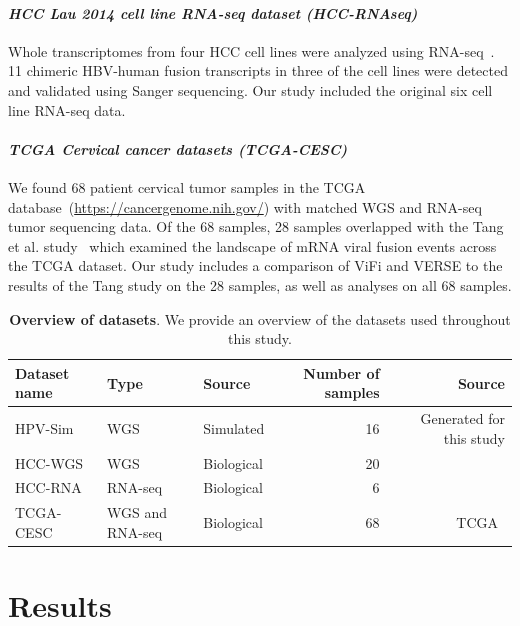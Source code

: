 \documentclass[10pt]{article}
\begin{document}
\paragraph{\emph{HCC Lau 2014 cell line RNA-seq dataset (HCC-RNAseq)}}
Whole transcriptomes from four HCC cell lines were analyzed using RNA-seq~\cite{Lau2014}.  11 chimeric HBV-human fusion transcripts in three of the cell lines were detected and validated using Sanger sequencing.  Our study included the original six cell line RNA-seq data.  

\paragraph{\emph{TCGA Cervical cancer datasets (TCGA-CESC)}}
We found 68 patient cervical tumor samples in the TCGA database~(\url{https://cancergenome.nih.gov/}) with matched WGS and RNA-seq tumor sequencing data.  Of the 68 samples, 28 samples overlapped with the Tang et al. study~\cite{Tang2013} which examined the landscape of mRNA viral fusion events across the TCGA dataset.  Our study includes a comparison of ViFi and VERSE to the results of the Tang study on the 28 samples, as well as analyses on all 68 samples.


\begin{table}[htb]
\centering
\caption{\textbf{Overview of datasets}.  We provide an overview of the datasets used throughout this study.  }
\label{table:data}
\begin{tabular}{|l|l|l|r|r|}
\hline
Dataset name & Type & Source & Number of samples & Source \\ \hline
HPV-Sim & WGS &Simulated& 16 & Generated for this study \\ \hline
HCC-WGS & WGS & Biological&20 & ~\cite{Sung2012} \\ \hline
HCC-RNA & RNA-seq & Biological&6 & ~\cite{Lau2014} \\ \hline
TCGA-CESC & WGS and RNA-seq &Biological& 68 & TCGA~\cite{TODO} \\ \hline 
\end{tabular}
\end{table}
\section{Results}

\end{document}
